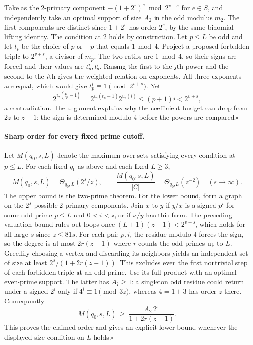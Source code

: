 Take as the $2$-primary component $-(1+2^v)^e\bmod 2^{v+s}$ for $e\in S$,
and independently take an optimal support of size $A_2$ in the odd
modulus $m_2$. The first components are distinct since $1+2^v$ has
order $2^s$, by the same binomial lifting identity. The condition at $2$
holds by construction. Let $p\le L$ be odd and let $t_p$ be the choice
of $p$ or $-p$ that equals $1\bmod4$. Project a proposed forbidden
triple to $2^{v+s}$, a divisor of $m_p$. The two ratios are $1\bmod4$,
so their signs are forced and their values are $t_p^i,t_p^j$.
Raising the first to the $j$th power and the second to the $i$th
gives the weighted relation on exponents. All three exponents are equal,
which would give $t_p^i\equiv1\pmod{2^{v+s}}$. Yet
\[
 2^{v_2(t_p^i-1)}=2^{v_2(t_p-1)}2^{v_2(i)}
        \le(p+1)i<2^{v+s},
\]
a contradiction. The argument explains why the coefficient budget can
drop from $2z$ to $z-1$: the sign is determined modulo $4$ before the
powers are compared.\hfill$\square$

\paragraph{Sharp order for every fixed prime cutoff.}
Let $M(q_0,s,L)$ denote the maximum over sets satisfying every condition
at $p\le L$. For each fixed $q_0$ as above and each fixed $L\ge3$,
\[
  M(q_0,s,L)=\Theta_{q_0,L}(2^s/z),\qquad
  \frac{M(q_0,s,L)}{|C|}=\Theta_{q_0,L}(z^{-2})
  \quad(s\longrightarrow\infty).
\]
The upper bound is the two-prime theorem. For the lower bound, form a
graph on the $2^s$ possible $2$-primary components. Join $x$ to $y$
if $y/x$ is a signed $p^i$ for some odd prime $p\le L$ and $0<i<z$,
or if $x/y$ has this form. The preceding valuation bound rules out
loops once $(L+1)(z-1)<2^{v+s}$, which holds for all large $s$ since
$z\le81s$. For each pair $p,i$, the residue modulo $4$ forces the sign,
so the degree is at most $2r(z-1)$ where $r$ counts the odd primes up to $L$.
Greedily choosing a vertex and discarding its neighbors yields an
independent set of size at least $2^s/(1+2r(z-1))$. This excludes even
the first nontrivial step of each forbidden triple at an odd prime.
Use its full product with an optimal even-prime support.
The latter has $A_2\ge1$: a singleton odd residue could return under
a signed $2^i$ only if $4^i\equiv1\pmod{3z}$, whereas $4=1+3$
has order $z$ there. Consequently
\[
 M(q_0,s,L)\ \ge\ \frac{A_2\,2^s}{1+2r(z-1)}.
\]
This proves the claimed order and gives an explicit lower bound whenever
the displayed size condition on $L$ holds.\hfill$\square$

